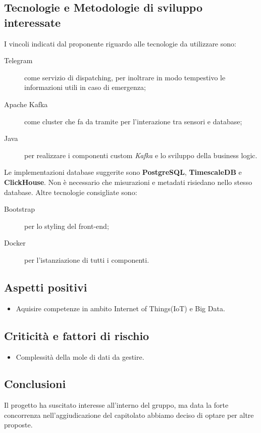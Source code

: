 \documentclass[../studio-di-fattibilita.tex]{subfiles}
\begin{document}
  \subsection{Tecnologie e Metodologie di sviluppo interessate}%
  \label{subsec:tecnologie_interessate}
  I vincoli indicati dal proponente riguardo alle tecnologie da utilizzare sono:
  \begin{description}
    \item[Telegram] come servizio di dispatching, per inoltrare in modo tempestivo le informazioni utili in caso di emergenza;
    \item[Apache Kafka] come cluster che fa da tramite per l'interazione tra sensori e database;
    \item[Java] per realizzare i componenti custom \textit{Kafka} e lo sviluppo della business logic.
  \end{description}
  Le implementazioni database suggerite sono \textbf{PostgreSQL}, \textbf{TimescaleDB} e \textbf{ClickHouse}.
  Non è necessario che misurazioni e metadati risiedano nello stesso database.
  Altre tecnologie consigliate sono:
  \begin{description}
    \item[Bootstrap] per lo styling del front-end;
    \item[Docker] per l'istanziazione di tutti i componenti.
  \end{description}


  \subsection{Aspetti positivi}%
  \label{subsec:aspetti_positivi}
  \begin{itemize}
    \item Aquisire competenze in ambito Internet of Things(IoT) e Big Data.
  \end{itemize}


  \subsection{Criticità e fattori di rischio}%
  \label{subsec:criticita_e_fattori_di_rischio}
  \begin{itemize}
    \item Complessità della mole di dati da gestire.
  \end{itemize}


  \subsection{Conclusioni}%
  \label{subsec:conclusioni}
  Il progetto ha suscitato interesse all'interno del gruppo, ma data la forte concorrenza nell'aggiudicazione del capitolato abbiamo deciso di optare per altre proposte.
\end{document}
